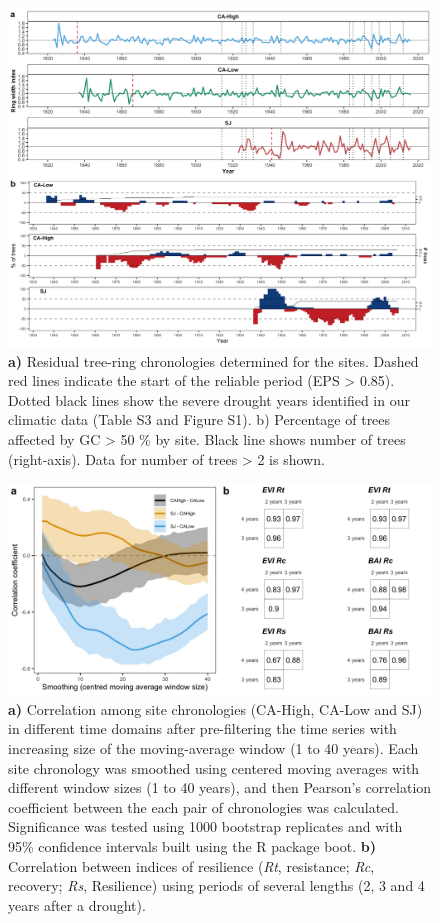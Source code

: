 \begin{figure}
\centering
\includegraphics[width=\textwidth]{img/dendro/dendro-s2chronos} 
\caption{\textbf{a)} Residual tree-ring chronologies determined for the \Qp sites. Dashed red lines indicate the start of the reliable period (EPS > 0.85). Dotted black lines show the severe drought years identified in our climatic data (Table S3 and Figure S1). b) Percentage of \Qp trees affected by GC > 50 \% by site. Black line shows number of trees (right-axis). Data for number of trees > 2 is shown.
}  
\label{fig:dendro:s2chronos}
\end{figure}

\newpage
\begin{figure}
\centering
\includegraphics[width=\textwidth]{img/dendro/dendro-s3correlation} 
\caption{\textbf{a)} Correlation among site chronologies (CA-High, CA-Low and SJ) in different time domains after pre-filtering the time series with increasing size of the moving-average window (1 to 40 years). Each site chronology was smoothed using centered moving averages with different window sizes (1 to 40 years), and then Pearson's correlation coefficient between the each pair of chronologies was calculated. Significance was tested using 1000 bootstrap replicates and with 95\% confidence intervals built using the R package boot. \textbf{b)} Correlation between indices of resilience (\emph{Rt}, resistance; \emph{Rc}, recovery; \emph{Rs}, Resilience) using periods of several lengths (2, 3 and 4 years after a drought).}  
\label{fig:dendro:s3correlations}
\end{figure}

